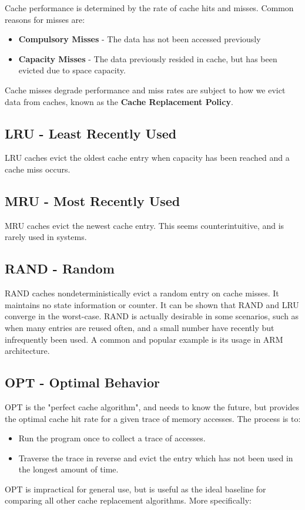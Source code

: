 \documentclass[twoside]{article}
\begin{document}
Cache performance is determined by the rate of cache hits and misses. Common
reasons for misses are:
\begin{itemize}
    \item \textbf{Compulsory Misses} - The data has not been accessed previously
    \item \textbf{Capacity Misses} - The data previously resided in cache, but
        has been evicted due to space capacity.
\end{itemize}
Cache misses degrade performance and miss rates are subject to how we evict data
from caches, known as the \textbf{Cache Replacement Policy}.

\subsection{LRU - Least Recently Used}
LRU caches evict the oldest cache entry when capacity has been reached and a
cache miss occurs.

\subsection{MRU - Most Recently Used}
MRU caches evict the newest cache entry. This seems counterintuitive, and is
rarely used in systems.

\subsection{RAND - Random}
RAND caches nondeterministically evict a random entry on cache misses. It
maintains no state information or counter. It can be shown that RAND and LRU
converge in the worst-case. RAND is actually desirable in some scenarios, such
as when many entries are reused often, and a small number have recently but
infrequently been used. A common and popular example is its usage in ARM
architecture.

\subsection{OPT - Optimal Behavior}
OPT is the "perfect cache algorithm", and needs to know the future, but provides
the optimal cache hit rate for a given trace of memory accesses. The process is
to:
\begin{itemize}
    \item Run the program once to collect a trace of accesses.
    \item Traverse the trace in reverse and evict the entry which has not been
        used in the longest amount of time.
\end{itemize}
OPT is impractical for general use, but is useful as the ideal baseline for
comparing all other cache replacement algorithms. More specifically:
\end{document}
